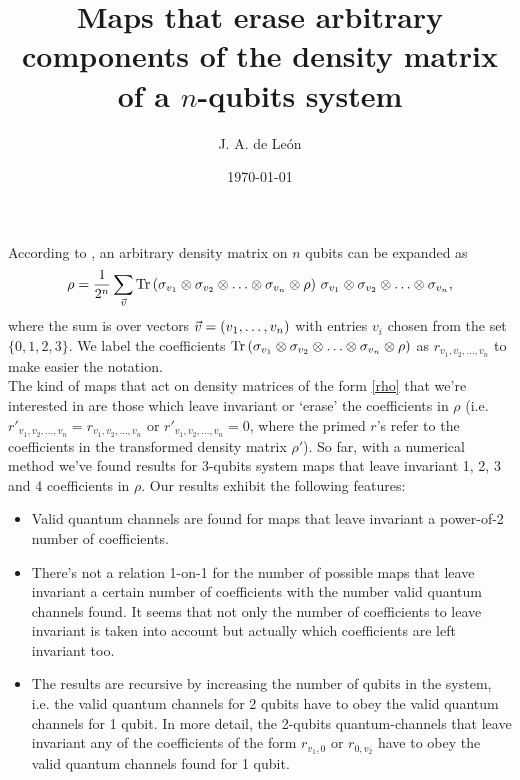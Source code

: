 \documentclass[11pt]{article}
\begin{document}
\title{Maps that erase arbitrary components of the density matrix of a $n$-qubits system} %
\author{J. A. de Le\'on} 


\date{\today}  

\maketitle


According to \cite{nielsen_chuang_2011}, an arbitrary density matrix on $n$ qubits can be expanded as
\begin{align}
	\rho = \frac{1}{2^n}\sum _{\vec{v}} \Tr \qty( \sigma _{v_1} \otimes \sigma_{v_2} \otimes \ldots \otimes \sigma_{v_n} \otimes \rho )\  \sigma _{v_1} \otimes \sigma_{v_2} \otimes \ldots \otimes \sigma_{v_n},
	\label{rho}
\end{align}
where the sum is over vectors $\vec{v}=\qty(v_1,\ldots, v_n)$ with entries $v_i$ chosen from the set $\{0,1,2,3\}$. We label the coefficients $\Tr \qty( \sigma _{v_1} \otimes \sigma_{v_2} \otimes \ldots \otimes \sigma_{v_n} \otimes \rho )$ as $r_{v_1, v_2,\ldots, v_n}$ to make easier the notation. \\

The kind of maps that act on density matrices of the form \eqref{rho} that we're interested in are those which leave invariant or
`erase' the coefficients in $\rho$ (i.e. $r'_{v_1, v_2,\ldots, v_n}=r_{v_1, v_2,\ldots, v_n}$ or $r'_{v_1, v_2,\ldots, v_n}=0$, where
the primed $r$'s refer to the coefficients in the transformed density matrix $\rho '$). So far, with a numerical method we've found 
results for 3-qubits system maps that leave invariant 1, 2, 3 and 4 coefficients in $\rho$. Our
results exhibit the following features:
\begin{itemize}
	\item Valid quantum channels are found for maps that leave invariant a power-of-2 number of coefficients.
	\item There's not a relation 1-on-1 for the number of possible maps that leave invariant a certain number of coefficients with the number valid
	quantum channels found. It seems that not only the number of coefficients to leave invariant is taken into account but actually
	which coefficients are left invariant too.
	\item The results are recursive by increasing the number of qubits in the system, i.e. the valid quantum channels for 2
	qubits have to obey the valid quantum channels for 1 qubit. In more detail, the 2-qubits quantum-channels that leave
	invariant any of the coefficients of the form $r_{v_1,0}$ or $r_{0,v_2}$ have to obey the valid quantum channels found for 1
	qubit.
\end{itemize}
\end{document}
